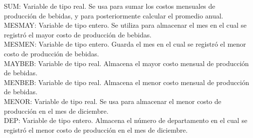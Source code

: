 \documentclass[11pt]{amsart}
\begin{document}
\noindent \quad SUM: Variable de tipo real. Se usa para sumar los costos mensuales de producción de bebidas, y para posteriormente calcular el promedio anual.\\

\noindent \quad MESMAY: Variable de tipo entero. Se utiliza para almacenar el mes en el cual se registró el mayor costo de producción de bebidas.\\

\noindent \quad MESMEN: Variable de tipo entero. Guarda el mes en el cual se registró el menor costo de producción de bebidas.\\

\noindent \quad MAYBEB: Variable de tipo real. Almacena el mayor costo mensual de producción de bebidas.\\

\noindent \quad MENBEB: Variable de tipo real. Almacena el menor costo mensual de producción de bebidas.\\

\noindent \quad MENOR: Variable de tipo real. Se usa para almacenar el menor costo de producción en el mes de diciembre.\\

\noindent \quad DEP: Variable de tipo entero. Almacena el número de departamento en el cual se registró el menor costo de producción en el mes de diciembre.\\
\end{document}
